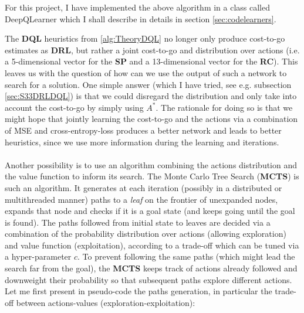\noindent For this project, I have implemented the above algorithm in a class called DeepQLearner which I shall describe in details in section \ref{sec:codelearners}.


\label{sec:TheoryMCTS}

The \textbf{DQL} heuristics from \ref{alg:TheoryDQL} no longer only produce cost-to-go estimates as \textbf{DRL}, but rather a joint cost-to-go and distribution over actions (i.e. a 5-dimensional vector for the \textbf{SP} and a 13-dimensional vector for the \textbf{RC}). This leaves us with the question of how can we use the output of such a network to search for a solution. One simple answer (which I have tried, see e.g. subsection \ref{sec:S33DRLDQL}) is that we could disregard the distribution and only take into account the cost-to-go by simply using $A^{*}$. The rationale for doing so is that we might hope that jointly learning the cost-to-go and the actions via a combination of MSE and cross-entropy-loss produces a better network and leads to better heuristics, since we use more information during the learning and iterations.
\\
\\
Another possibility is to use an algorithm combining the actions distribution and the value function to inform its search. The Monte Carlo Tree Search (\textbf{MCTS}) is such an algorithm. It generates at each iteration (possibly in a distributed or multithreaded manner) paths to a \textit{leaf} on the frontier of unexpanded nodes, expands that node and checks if it is a goal state (and keeps going until the goal is found). The paths followed from initial state to leaves are decided via a combination of the probability distribution over actions (allowing exploration) and value function (exploitation), according to a trade-off which can be tuned via a hyper-parameter $c$. To prevent following the same paths (which might lead the search far from the goal), the \textbf{MCTS} keeps track of actions already followed and downweight their probability so that subsequent paths explore different actions. Let me first present in pseudo-code the paths generation, in particular the trade-off between actions-values (exploration-exploitation):
\\


